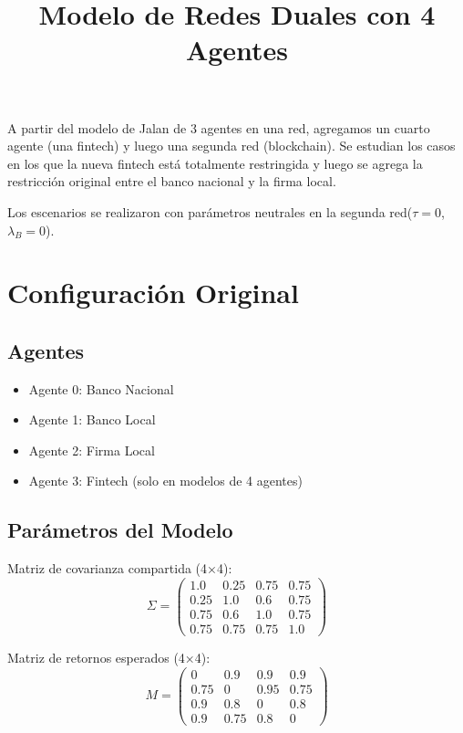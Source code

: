 \documentclass[12pt]{article}
\title{Modelo de Redes Duales con 4 Agentes}
\author{}
\date{}
\begin{document}
\maketitle

A partir del modelo de Jalan de 3 agentes en una red, agregamos un cuarto agente (una fintech) y luego una segunda red (blockchain). Se estudian los casos en los que la nueva fintech está totalmente restringida y luego se agrega la restricción original entre el banco nacional y la firma local. 


Los escenarios se realizaron con parámetros neutrales en la segunda red($\tau = 0$, $\lambda_B = 0$).

\section{Configuración Original}

\subsection{Agentes}
\begin{itemize}
\item Agente 0: Banco Nacional
\item Agente 1: Banco Local  
\item Agente 2: Firma Local
\item Agente 3: Fintech (solo en modelos de 4 agentes)
\end{itemize}

\subsection{Parámetros del Modelo}

Matriz de covarianza compartida (4×4):
\begin{equation}
\Sigma = \begin{pmatrix}
1.0  & 0.25 & 0.75 & 0.75 \\
0.25 & 1.0  & 0.6  & 0.75 \\
0.75 & 0.6  & 1.0  & 0.75 \\
0.75 & 0.75 & 0.75 & 1.0
\end{pmatrix}
\end{equation}

Matriz de retornos esperados (4×4):
\begin{equation}
M = \begin{pmatrix}
0    & 0.9  & 0.9  & 0.9  \\
0.75 & 0    & 0.95 & 0.75 \\
0.9  & 0.8  & 0    & 0.8  \\
0.9  & 0.75 & 0.8  & 0
\end{pmatrix}
\end{equation}
\end{document}
